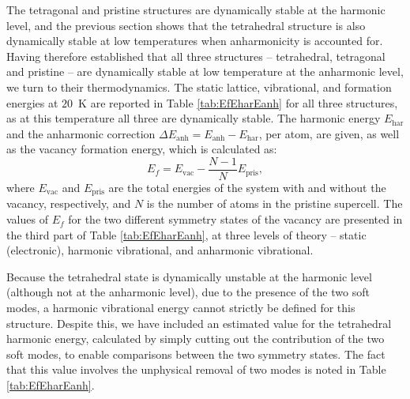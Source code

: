 \documentclass[aps,showpacs,prb,reprint,superscriptaddress,longbibliography]{revtex4-1}
\begin{document}
The tetragonal and pristine structures are dynamically stable at the
harmonic level, and the previous section shows that the tetrahedral
structure is also dynamically stable at low temperatures when
anharmonicity is accounted for. Having therefore established that all
three structures -- tetrahedral, tetragonal and pristine -- are
dynamically stable at low temperature at the anharmonic level, we turn
to their thermodynamics.  The static lattice, vibrational, and
formation energies at $20$~K are reported in Table
\ref{tab:EfEharEanh} for all three structures, as at this temperature
all three are dynamically stable.  The harmonic energy $E_\text{har}$
and the anharmonic correction
$\Delta E_\text{anh}=E_\text{anh}-E_\text{har}$, per atom, are given,
as well as the vacancy formation energy, which is calculated
as:\cite{corsetti_system-size_2011}
\[ E_f = E_\text{vac} - \frac{N-1}{N} E_\text{pris}, \] where
$E_\text{vac}$ and $E_\text{pris}$ are the total energies of the
system with and without the vacancy, respectively, and $N$ is the
number of atoms in the pristine supercell. The values of $E_f$ for the
two different symmetry states of the vacancy are presented in the
third part of Table \ref{tab:EfEharEanh}, at three levels of theory --
static (electronic), harmonic vibrational, and anharmonic
vibrational.

Because the tetrahedral state is dynamically unstable at the harmonic
level (although not at the anharmonic level), due to the presence of
the two soft modes, a harmonic vibrational energy cannot strictly be
defined for this structure. Despite this, we have included an
estimated value for the tetrahedral harmonic energy, calculated by
simply cutting out the contribution of the two soft modes, to enable
comparisons between the two symmetry states. The fact that this value
involves the unphysical removal of two modes is noted in Table
\ref{tab:EfEharEanh}.
\end{document}
